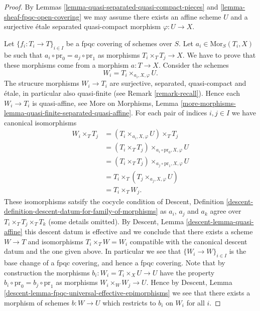 \begin{proof}
By
Lemmas \ref{lemma-quasi-separated-quasi-compact-pieces}
and \ref{lemma-sheaf-fpqc-open-covering}
we may assume there exists an affine scheme $U$ and a
surjective \'etale separated quasi-compact morphism $\varphi : U \to X$.

\medskip\noindent
Let $\{f_i : T_i \to T\}_{i \in I}$ be a fpqc covering of schemes over $S$.
Let $a_i \in \text{Mor}_S(T_i, X)$ be such that
$a_i \circ \text{pr}_0 = a_j \circ \text{pr}_1$ as morphisms
$T_i \times_T T_j \to X$. We have to prove that these morphisms
come from a morphism $a : T \to X$. Consider the schemes
$$
W_i = T_i \times_{a_i, X, \varphi} U.
$$
The strucure morphisms $W_i \to T_i$ are surjective, separated, quasi-compact
and \'etale, in particular also quasi-finite (see Remark \ref{remark-recall}).
Hence each $W_i \to T_i$ is quasi-affine, see
More on Morphisms,
Lemma \ref{more-morphisms-lemma-quasi-finite-separated-quasi-affine}.
For each pair of indices $i, j \in I$ we have canonical isomorphisms
\begin{align*}
W_i \times_T T_j & =
(T_i \times_{a_i, X, \varphi} U) \times_T T_j \\
& =
(T_i \times_T T_j) \times_{a_i \circ \text{pr}_0, X, \varphi} U \\
& =
(T_i \times_T T_j) \times_{a_j \circ \text{pr}_1, X, \varphi} U \\
& =
T_i \times_T (T_j \times_{a_j, X, \varphi} U) \\
& =
T_i \times_T W_j.
\end{align*}
These isomorphisms satsify the cocycle condition of
Descent,
Definition \ref{descent-definition-descent-datum-for-family-of-morphisms}
as $a_i$, $a_j$ and $a_k$ agree over $T_i \times_T T_j \times_T T_k$
(some details omitted). By
Descent, Lemma \ref{descent-lemma-quasi-affine}
this descent datum is effective and
we conclude that there exists a scheme $W \to T$ and isomorphisms
$T_i \times_T W = W_i$ compatible with the canonical descent datum
and the one given above. In particular we see that
$\{W_i \to W\}_{i \in I}$ is the base change of a fpqc covering,
and hence a fpqc covering. Note that by construction the
morphisms $b_i : W_i = T_i \times_X U \to U$ have the property
$b_i \circ \text{pr}_0 = b_j \circ \text{pr}_1$ as morphisms
$W_i \times_W W_j \to U$. Hence by
Descent, Lemma \ref{descent-lemma-fpqc-universal-effective-epimorphisms}
we see that there exists a morphism of schemes $b : W \to U$
which restricts to $b_i$ on $W_i$ for all $i$.


\end{proof}
